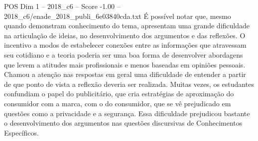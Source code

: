 \begin{textsample}{POS Dim 1 – 2018\_c6 – Score -1.00 – 2018\_c6/enade\_2018\_publi\_6e03840cda.txt}
É possível notar que, mesmo quando demonstram conhecimento do tema, apresentam uma grande dificuldade na articulação de ideias, no desenvolvimento dos argumentos e das reflexões.
O incentivo a modos de estabelecer conexões entre as informações que atravessam seu cotidiano e a teoria poderia ser uma boa forma de desenvolver abordagens que levem a atitudes mais profissionais e menos baseadas em opiniões pessoais.
Chamou a atenção nas respostas em geral uma dificuldade de entender a partir de que ponto de vista a reflexão deveria ser realizada.
Muitas vezes, os estudantes confundiam o papel do publicitário, que cria estratégias de aproximação do consumidor com a marca, com o do consumidor, que se vê prejudicado em questões como a privacidade e a segurança.
Essa dificuldade prejudicou bastante o desenvolvimento dos argumentos nas questões discursivas de Conhecimentos Específicos.

\end{textsample}
